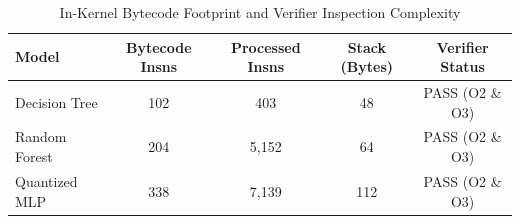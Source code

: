 \begin{table}[t]
\centering
\caption{In-Kernel Bytecode Footprint and Verifier Inspection Complexity}
\label{tab:kernel_footprint}
\begin{tabular}{lcccc}
\toprule
\textbf{Model} & \textbf{Bytecode Insns} & \textbf{Processed Insns} & \textbf{Stack (Bytes)} & \textbf{Verifier Status} \\
\midrule
Decision Tree  & 102 & 403   & 48  & PASS (O2 \& O3) \\
Random Forest  & 204 & 5,152 & 64  & PASS (O2 \& O3) \\
Quantized MLP  & 338 & 7,139 & 112 & PASS (O2 \& O3) \\
\bottomrule
\end{tabular}
\end{table}
